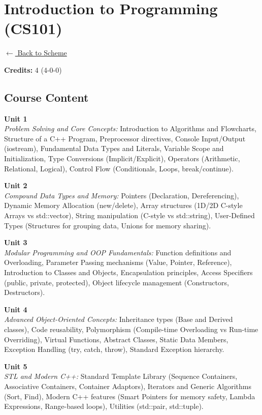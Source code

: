\section*{Introduction to Programming (CS101)}
\label{course:CS101}

\noindent \small{\hyperref[main:scheme]{$\leftarrow$ Back to Scheme}} \vspace{0.5cm}

\noindent \textbf{Credits:} 4 (4-0-0)

\subsection*{Course Content}
\noindent\textbf{Unit 1} \\
\textit{Problem Solving and Core Concepts:} Introduction to Algorithms and Flowcharts, Structure of a C++ Program, Preprocessor directives, Console Input/Output (iostream), Fundamental Data Types and Literals, Variable Scope and Initialization, Type Conversions (Implicit/Explicit), Operators (Arithmetic, Relational, Logical), Control Flow (Conditionals, Loops, break/continue).

\vspace{0.3cm}

\noindent\textbf{Unit 2} \\
\textit{Compound Data Types and Memory:} Pointers (Declaration, Dereferencing), Dynamic Memory Allocation (new/delete), Array structures (1D/2D C-style Arrays vs std::vector), String manipulation (C-style vs std::string), User-Defined Types (Structures for grouping data, Unions for memory sharing).

\vspace{0.3cm}

\noindent\textbf{Unit 3} \\
\textit{Modular Programming and OOP Fundamentals:} Function definitions and Overloading, Parameter Passing mechanisms (Value, Pointer, Reference), Introduction to Classes and Objects, Encapsulation principles, Access Specifiers (public, private, protected), Object lifecycle management (Constructors, Destructors).

\vspace{0.3cm}

\noindent\textbf{Unit 4} \\
\textit{Advanced Object-Oriented Concepts:} Inheritance types (Base and Derived classes), Code reusability, Polymorphism (Compile-time Overloading vs Run-time Overriding), Virtual Functions, Abstract Classes, Static Data Members, Exception Handling (try, catch, throw), Standard Exception hierarchy.

\vspace{0.3cm}

\noindent\textbf{Unit 5} \\
\textit{STL and Modern C++:} Standard Template Library (Sequence Containers, Associative Containers, Container Adaptors), Iterators and Generic Algorithms (Sort, Find), Modern C++ features (Smart Pointers for memory safety, Lambda Expressions, Range-based loops), Utilities (std::pair, std::tuple).

\newpage
{}